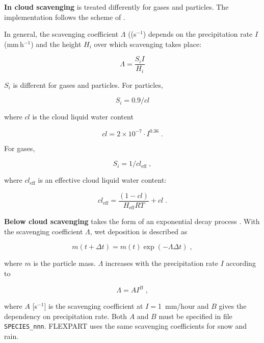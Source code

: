 \documentclass{egu}                  %
\begin{document}
{\bf In cloud scavenging} is treated differently for gases and particles.  
The implementation follows the scheme of \citet{hertel1995}.

In general, the scavenging coefficient $\Lambda$ ((s$^{-1}$) depends on the precipitation
rate $I$ (mm\,h$^{-1}$) and the height $H_i$ over which scavenging takes place:

\begin{equation}
\Lambda=\frac{S_i I}{H_i}
\end{equation}

$S_i$ is different for gases and particles. For particles,

\begin{equation}
S_i=0.9/cl
\end{equation}

where $cl$ is the cloud liquid water content

\begin{equation}
cl=2\times 10^{-7}\cdot I^{0.36} \;.
\end{equation}

For gases,

\begin{equation}
S_i=1/cl_\text{eff} \;,
\end{equation}

where $cl_\text{eff}$ is an effective cloud liquid water content:

\begin{equation}
cl_\text{eff}=\frac{(1-cl)}{H_\text{eff}RT}+cl \; .
\end{equation}

{\bf Below cloud scavenging} takes the form of an exponential decay process
\citep{mcmahon1979}.  With the scavenging coefficient $\Lambda$, wet
deposition is described as

\begin{equation}
m(t+\Delta t)=m(t) \exp (- \Lambda \Delta t) \;,
\end{equation}

where $m$ is the particle mass.  $\Lambda$ increases with the precipitation
rate $I$ according to

\begin{equation}
\Lambda=AI^{B} \;,
\label{wetscav}
\end{equation}

where $A$ [s$^{-1}$] is the scavenging coefficient at $I=$1~mm/hour and $B$
gives the dependency on precipitation rate.  Both $A$ and $B$ must be specified
in file \verb|SPECIES_nnn|.  FLEXPART uses the same scavenging coefficients for
snow and rain.
\end{document}
